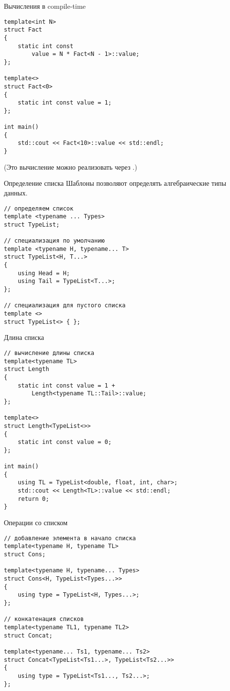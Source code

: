 \documentclass{beamer}
\begin{document}
\begin{frame}[fragile]{Вычисления в compile-time}
\begin{lstlisting}
template<int N> 
struct Fact 
{
    static int const
        value = N * Fact<N - 1>::value;
};

template<> 
struct Fact<0> 
{
    static int const value = 1;
};

int main() 
{
    std::cout << Fact<10>::value << std::endl;
}
\end{lstlisting}

(Это вычисление можно реализовать через .) 
\end{frame}


\begin{frame}[fragile]{Определение списка}
Шаблоны позволяют определять алгебраические типы данных.
\begin{lstlisting}
// определяем список
template <typename ... Types>
struct TypeList; 

// специализация по умолчанию
template <typename H, typename... T>
struct TypeList<H, T...> 
{
    using Head = H;
    using Tail = TypeList<T...>;
};

// специализация для пустого списка
template <>
struct TypeList<> { };
\end{lstlisting}
\end{frame}

\begin{frame}[fragile]{Длина списка}
\begin{lstlisting}
// вычисление длины списка
template<typename TL>
struct Length
{
    static int const value = 1 +
        Length<typename TL::Tail>::value;
};

template<>
struct Length<TypeList<>>
{
    static int const value = 0;
};

int main()
{
    using TL = TypeList<double, float, int, char>;
    std::cout << Length<TL>::value << std::endl;
    return 0;
}
\end{lstlisting}
\end{frame}

\begin{frame}[fragile]{Операции со списком}
\begin{lstlisting}
// добавление элемента в начало списка
template<typename H, typename TL>
struct Cons;

template<typename H, typename... Types>
struct Cons<H, TypeList<Types...>>
{
    using type = TypeList<H, Types...>;
};

// конкатенация списков
template<typename TL1, typename TL2>
struct Concat;

template<typename... Ts1, typename... Ts2>
struct Concat<TypeList<Ts1...>, TypeList<Ts2...>>
{
    using type = TypeList<Ts1..., Ts2...>;
};
\end{lstlisting}
\end{frame}
\end{document}
